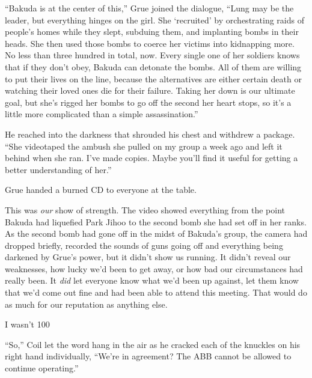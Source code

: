 ``Bakuda is at the center of this,'' Grue joined the dialogue, ``Lung may be the leader, but everything hinges on the girl.  She `recruited' by orchestrating raids of people's homes while they slept, subduing them, and implanting bombs in their heads.  She then used those bombs to coerce her victims into kidnapping more.  No less than three hundred in total, now.  Every single one of her soldiers knows that if they don't obey, Bakuda can detonate the bombs.  All of them are willing to put their lives on the line, because the alternatives are either certain death or watching their loved ones die for their failure.  Taking her down is our ultimate goal, but she's rigged her bombs to go off the second her heart stops, so it's a little more complicated than a simple assassination.''



He reached into the darkness that shrouded his chest and withdrew a package.  ``She videotaped the ambush she pulled on my group a week ago and left it behind when she ran.  I've made copies.  Maybe you'll find it useful for getting a better understanding of her.''



Grue handed a burned CD to everyone at the table.



This was \emph{our} show of strength.  The video showed everything from the point Bakuda had liquefied Park Jihoo to the second bomb she had set off in her ranks.  As the second bomb had gone off in the midst of Bakuda's group, the camera had dropped briefly, recorded the sounds of guns going off and everything being darkened by Grue's power, but it didn't show us running.  It didn't reveal our weaknesses, how lucky we'd been to get away, or how bad our circumstances had really been.  It \emph{did} let everyone know what we'd been up against, let them know that we'd come out fine and had been able to attend this meeting.  That would do as much for our reputation as anything else.



I wasn't 100%



``So,'' Coil let the word hang in the air as he cracked each of the knuckles on his right hand individually, ``We're in agreement?  The ABB cannot be allowed to continue operating.''



